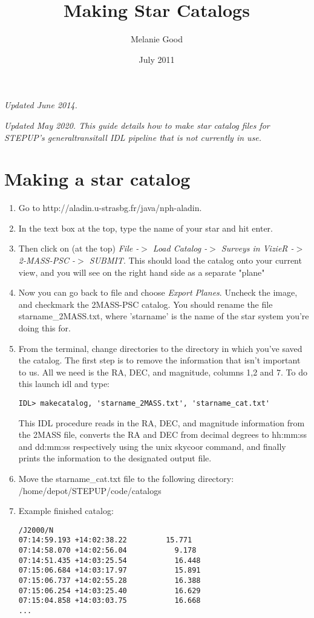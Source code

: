 \documentclass[10pt,preprint]{article}
\begin{document}
\title{Making Star Catalogs}
\author{Melanie Good}
\date{July 2011}
\maketitle

\emph{Updated June 2014.}

\emph{Updated May 2020. This guide details how to make star catalog files for STEPUP's \emph{generaltransitall} IDL pipeline that is not currently in use.}

\section{Making a star catalog}

\begin{enumerate}
\item Go to http://aladin.u-strasbg.fr/java/nph-aladin.
\item In the text box at the top, type the name of your star and hit enter.
\item Then click on (at the top) \emph{File -$>$ Load Catalog -$>$ Surveys in VizieR -$>$ 2-MASS-PSC -$>$ SUBMIT}. This should load the catalog onto your current view, and you will see on the right hand side as a separate "plane"
\item Now you can go back to file and choose \emph{Export Planes}. Uncheck the image, and checkmark the 2MASS-PSC catalog. You should rename the file starname\_2MASS.txt, where 'starname' is the name of the star system you're doing this for.
\item From the terminal, change directories to the directory in which you've saved the catalog. The first step is to remove the information that isn't important to us. All we need is the RA, DEC, and magnitude, columns 1,2 and 7. To do this launch idl and type:
\begin{verbatim}
IDL> makecatalog, 'starname_2MASS.txt', 'starname_cat.txt'
\end{verbatim}
This IDL procedure reads in the RA, DEC, and magnitude information from the 2MASS file, converts the RA and DEC from decimal degrees to hh:mm:ss and dd:mm:ss respectively using the unix skycoor command, and finally prints the information to the designated output file.
\item Move the starname\_cat.txt file to the following directory: /home/depot/STEPUP/code/catalogs
\item Example finished catalog:
\begin{verbatim}
/J2000/N
07:14:59.193 +14:02:38.22         15.771
07:14:58.070 +14:02:56.04	        9.178
07:14:51.435 +14:03:25.54	        16.448
07:15:06.684 +14:03:17.97	        15.891
07:15:06.737 +14:02:55.28	        16.388
07:15:06.254 +14:03:25.40	        16.629
07:15:04.858 +14:03:03.75	        16.668
...
\end{verbatim}
\end{enumerate}
\end{document}
